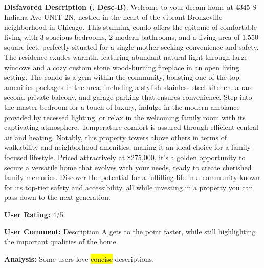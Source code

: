 \begin{center}
\begin{tcolorbox}[colback=white,colframe=gray!20,width=0.95\textwidth]
    { \footnotesize \textbf{Disfavored Description (\agentname, Desc-B)}:  Welcome to your dream home at 4345 S Indiana Ave UNIT 2N, nestled in the heart of the vibrant Bronzeville neighborhood in Chicago. This stunning condo offers the epitome of comfortable living with 3 spacious bedrooms, 2 modern bathrooms, and a living area of 1,550 square feet, perfectly situated for a single mother seeking convenience and safety. The residence exudes warmth, featuring abundant natural light through large windows and a cozy custom stone wood-burning fireplace in an open living setting. The condo is a gem within the community, boasting one of the top amenities packages in the area, including a stylish stainless steel kitchen, a rare second private balcony, and garage parking that ensures convenience. Step into the master bedroom for a touch of luxury, indulge in the modern ambiance provided by recessed lighting, or relax in the welcoming family room with its captivating atmosphere. Temperature comfort is assured through efficient central air and heating. Notably, this property towers above others in terms of walkability and neighborhood amenities, making it an ideal choice for a family-focused lifestyle. Priced attractively at \$275,000, it’s a golden opportunity to secure a versatile home that evolves with your needs, ready to create cherished family memories. Discover the potential for a fulfilling life in a community known for its top-tier safety and accessibility, all while investing in a property you can pass down to the next generation. }
    \vspace{0.2em}

    {\footnotesize\textbf{User Rating:}  4/5}
    \vspace{0.2em}

    {\footnotesize\textbf{User Comment:}  Description A gets to the point faster, while still highlighting the important qualities of the home.}
    \vspace{0.2em}

    {\footnotesize \textbf{Analysis:}  Some users love \hl{concise} descriptions.}  
    \end{tcolorbox}\end{center}


